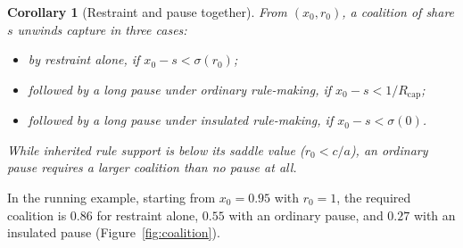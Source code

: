\documentclass[11pt]{article}
\theoremstyle{plain}
\newtheorem{corollary}{Corollary}
\theoremstyle{definition}
\newcommand{\Rcap}{R_{\mathrm{cap}}}
\begin{document}
\begin{corollary}[Restraint and pause together]\label{cor:together}
From $(x_0,r_0)$, a coalition of share $s$ unwinds capture in three cases:
\begin{itemize}[leftmargin=*]
\item by restraint alone, if $x_0-s<\sigma(r_0)$;
\item followed by a long pause under ordinary rule-making, if $x_0-s<1/\Rcap$;
\item followed by a long pause under insulated rule-making, if $x_0-s<\sigma(0)$.
\end{itemize}
While inherited rule support is below its saddle value ($r_0<c/a$), an ordinary pause requires a larger coalition than no pause at all.
\end{corollary}

In the running example, starting from $x_0=0.95$ with $r_0=1$, the required coalition is $0.86$ for restraint alone, $0.55$ with an ordinary pause, and $0.27$ with an insulated pause (Figure~\ref{fig:coalition}).
\end{document}

